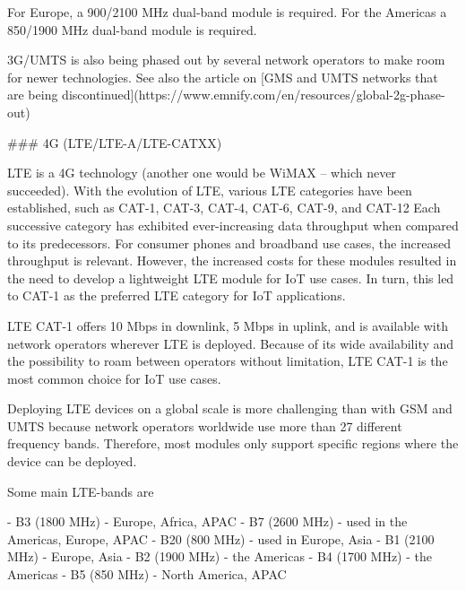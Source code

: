 \documentclass[11pt, oneside]{article}   	%
\newcommand{\addspace}{\vspace{2mm}}
\begin{document}
\begin{markdown}
For Europe, a 900/2100 MHz dual-band module is required.
For the Americas a 850/1900 MHz dual-band module is required.

3G/UMTS is also being phased out by several network operators to make room for newer technologies.
See also the article on [GMS and UMTS networks that are being discontinued](https://www.emnify.com/en/resources/global-2g-phase-out)

### 4G (LTE/LTE-A/LTE-CATXX)

LTE is a 4G technology (another one would be WiMAX -- which never succeeded).
With the evolution of LTE, various LTE categories have been established, such as CAT-1, CAT-3, CAT-4, CAT-6, CAT-9, and CAT-12 Each successive category has exhibited ever-increasing data throughput when compared to its predecessors.
For consumer phones and broadband use cases, the increased throughput is relevant.
However, the increased costs for these modules resulted in the need to develop a lightweight LTE module for IoT use cases.
In turn, this led to CAT-1 as the preferred LTE category for IoT applications.

LTE CAT-1 offers 10 Mbps in downlink, 5 Mbps in uplink, and is available with network operators wherever LTE is deployed.
Because of its wide availability and the possibility to roam between operators without limitation, LTE CAT-1 is the most common choice for IoT use cases.

Deploying LTE devices on a global scale is more challenging than with GSM and UMTS because network operators worldwide use more than 27 different frequency bands.
Therefore, most modules only support specific regions where the device can be deployed.

\end{markdown}
\pagebreak[4]

\begin{markdown}

Some main LTE-bands are

\end{markdown}
\addspace
\begin{markdown}
- B3 (1800 MHz) - Europe, Africa, APAC
- B7 (2600 MHz) - used in the Americas, Europe, APAC
- B20 (800 MHz) - used in Europe, Asia
- B1 (2100 MHz) - Europe, Asia
- B2 (1900 MHz) - the Americas
- B4 (1700 MHz) - the Americas
- B5 (850 MHz) - North America, APAC
\end{markdown}
\addspace
\end{document}
